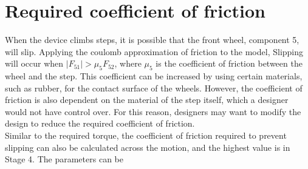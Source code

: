 \section{Required coefficient of friction}

When the device climbs steps, it is possible that the front wheel, component 5, will slip. Applying the coulomb approximation of friction to the model, Slipping will occur when $|F_{51}| > \mu_5 F_{52}$, where $\mu_5$ is the coefficient of friction between the wheel and the step. This coefficient can be increased by using certain materials, such as rubber, for the contact surface of the wheels. However, the coefficient of friction is also dependent on the material of the step itself, which a designer would not have control over. For this reason, designers may want to modify the design to reduce the required coefficient of friction.\\
Similar to the required torque, the coefficient of friction required to prevent slipping can also be calculated across the motion, and the highest value is in Stage 4. The parameters can be 
